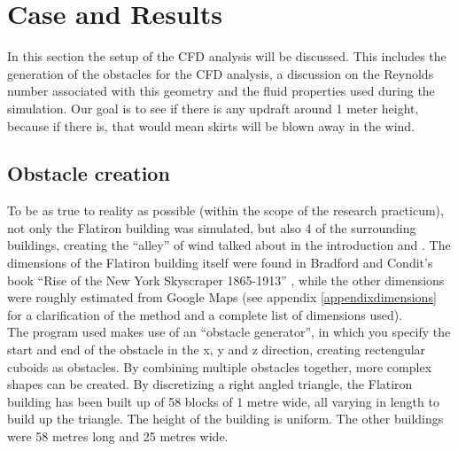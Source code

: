 \section{Case and Results}
\label{method}
In this section the setup of the CFD analysis will be discussed. This includes the generation of the obstacles for the CFD analysis, a discussion on the Reynolds number associated with this geometry and the fluid properties used during the simulation. Our goal is to see if there is any updraft around 1 meter height, because if there is, that would mean skirts will be blown away in the wind. 
\subsection{Obstacle creation}
\label{obstacles}
To be as true to reality as possible (within the scope of the research practicum), not only the Flatiron building was simulated, but also 4 of the surrounding buildings, creating the ``alley'' of wind talked about in the introduction and \cite{dresses}. The dimensions of the Flatiron building itself were found in Bradford and Condit's book ``Rise of the New York Skyscraper 1865-1913'' \cite{skyscraper}, while the other dimensions were roughly estimated from Google Maps (see appendix \ref{appendixdimensions} for a clarification of the method and a complete list of dimensions used). \\
\indent %
The program used makes use of an ``obstacle generator'', in which you specify the start and end of the obstacle in the x, y and z direction, creating rectengular cuboids as obstacles. By combining multiple obstacles together, more complex shapes can be created. By discretizing a right angled triangle, the Flatiron building has been built up of 58 blocks of 1 metre wide, all varying in length to build up the triangle. The height of the building is uniform. The other buildings were 58 metres long and 25 metres wide. \\
